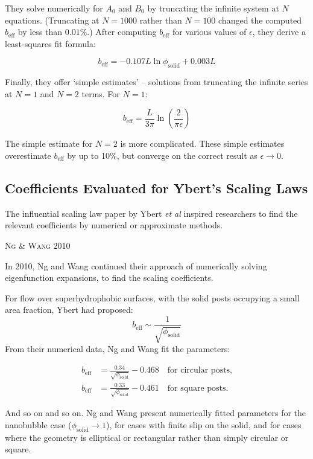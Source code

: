\documentclass[a4paper]{report}
\newcommand{\beff}{\ensuremath{b_{\mathrm{eff}}}}
\newcommand{\phisol}{\ensuremath{\phi_{\mathrm{solid}}}}
\newcommand{\paper}[1]
         {\colorbox[gray]{0.8}{ \textsc{#1}}
         
         }
\begin{document}
They solve numerically for $A_0$ and $B_0$ by truncating the infinite system at $N$ equations.  (Truncating at $N=1000$ rather than $N=100$ changed the computed $\beff$ by less than $0.01\%$.) After computing $\beff$ for various values of $\epsilon$, they derive a least-squares fit formula:

\begin{equation*}
\beff = -0.107 L \ln \phisol + 0.003L
\end{equation*}

Finally, they offer `simple estimates' -- solutions from truncating the infinite series at $N=1$ and $N=2$ terms. For $N=1$:

\begin{equation*}
\beff = \frac{L}{3\pi} \ln \left( \frac{2}{\pi \epsilon} \right)
\end{equation*}

The simple estimate for $N=2$ is more complicated.  These simple estimates overestimate $\beff$ by up to 10\%, but converge on the correct result as $\epsilon \rightarrow 0$.

\subsection*{Coefficients Evaluated for Ybert's Scaling Laws}

The influential scaling law paper by Ybert \emph{et al} \cite{Ybert2007} inspired researchers to find the relevant coefficients by numerical or approximate methods.

\paper{Ng \& Wang 2010}
In 2010, Ng and Wang \cite{NgWang2010} continued their approach of numerically solving eigenfunction expansions, to find the scaling coefficients.

For flow over superhydrophobic surfaces, with the solid posts occupying a small area fraction, Ybert had proposed:
\begin{equation*}
\beff \sim \frac{1}{\sqrt{\phisol}}
\end{equation*}
From their numerical data, Ng and Wang fit the parameters:

\begin{align*}
\beff &= \frac{0.34}{\sqrt{\phisol}} - 0.468 \quad \text{for circular posts,} \\
\beff &= \frac{0.33}{\sqrt{\phisol}} - 0.461 \quad \text{for square posts.}
\end{align*}

And so on and so on.  Ng and Wang present numerically fitted parameters for the nanobubble case ($\phisol \rightarrow 1$), for cases with finite slip on the solid, and for cases where the geometry is elliptical or rectangular rather than simply circular or square.
\end{document}
